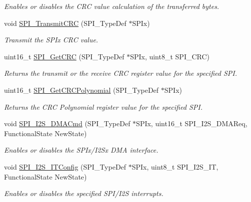 \begin{DoxyCompactItemize}
\begin{DoxyCompactList}\small\item\em Enables or disables the C\+RC value calculation of the transferred bytes. \end{DoxyCompactList}\item 
void \mbox{\hyperlink{group___s_p_i_gace8b1058e09bab150b0dbe5978810273}{S\+P\+I\+\_\+\+Transmit\+C\+RC}} (S\+P\+I\+\_\+\+Type\+Def $\ast$S\+P\+Ix)
\begin{DoxyCompactList}\small\item\em Transmit the S\+P\+Ix C\+RC value. \end{DoxyCompactList}\item 
uint16\+\_\+t \mbox{\hyperlink{group___s_p_i_ga4c81c193516e82cf0a2fdc149ef20cc6}{S\+P\+I\+\_\+\+Get\+C\+RC}} (S\+P\+I\+\_\+\+Type\+Def $\ast$S\+P\+Ix, uint8\+\_\+t S\+P\+I\+\_\+\+C\+RC)
\begin{DoxyCompactList}\small\item\em Returns the transmit or the receive C\+RC register value for the specified S\+PI. \end{DoxyCompactList}\item 
uint16\+\_\+t \mbox{\hyperlink{group___s_p_i_ga80fb9374cfce670f29128bb78568353f}{S\+P\+I\+\_\+\+Get\+C\+R\+C\+Polynomial}} (S\+P\+I\+\_\+\+Type\+Def $\ast$S\+P\+Ix)
\begin{DoxyCompactList}\small\item\em Returns the C\+RC Polynomial register value for the specified S\+PI. \end{DoxyCompactList}\item 
void \mbox{\hyperlink{group___s_p_i_gabed5b91a8576e6d578f364cc0e807e4a}{S\+P\+I\+\_\+\+I2\+S\+\_\+\+D\+M\+A\+Cmd}} (S\+P\+I\+\_\+\+Type\+Def $\ast$S\+P\+Ix, uint16\+\_\+t S\+P\+I\+\_\+\+I2\+S\+\_\+\+D\+M\+A\+Req, Functional\+State New\+State)
\begin{DoxyCompactList}\small\item\em Enables or disables the S\+P\+Ix/\+I2\+Sx D\+MA interface. \end{DoxyCompactList}\item 
void \mbox{\hyperlink{group___s_p_i_ga17f4ef132e8ddbf94cb6b1688d181e41}{S\+P\+I\+\_\+\+I2\+S\+\_\+\+I\+T\+Config}} (S\+P\+I\+\_\+\+Type\+Def $\ast$S\+P\+Ix, uint8\+\_\+t S\+P\+I\+\_\+\+I2\+S\+\_\+\+IT, Functional\+State New\+State)
\begin{DoxyCompactList}\small\item\em Enables or disables the specified S\+P\+I/\+I2S interrupts. \end{DoxyCompactList}\item 

\end{DoxyCompactItemize}
